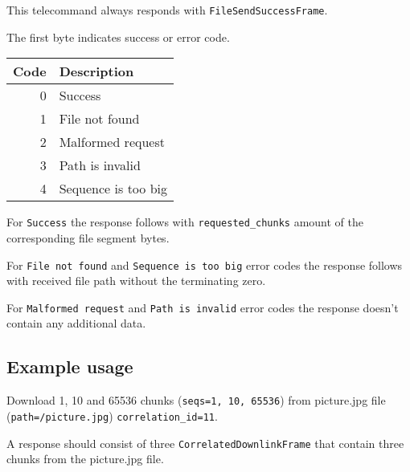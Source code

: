 This telecommand always responds with \texttt{FileSendSuccessFrame}.

The first byte indicates success or error code.

\begin{tabular}{r | l}
	Code & Description \\ \hline
	0 		& Success \\
	1 		& File not found \\
	2 		& Malformed request \\
	3 		& Path is invalid \\
	4 		& Sequence is too big
\end{tabular}

For \texttt{Success} the response follows with \texttt{requested\_chunks} amount of the corresponding file segment bytes.

For \texttt{File not found} and \texttt{Sequence is too big} error codes the response follows with received file path without the terminating zero.

For \texttt{Malformed request} and \texttt{Path is invalid} error codes the response doesn't contain any additional data.

\subsection{Example usage}
Download 1, 10 and 65536 chunks (\texttt{seqs=1, 10, 65536}) from picture.jpg file (\texttt{path=/picture.jpg}) \texttt{correlation\_id=11}.


A response should consist of three \texttt{CorrelatedDownlinkFrame} that contain three chunks from the picture.jpg file.